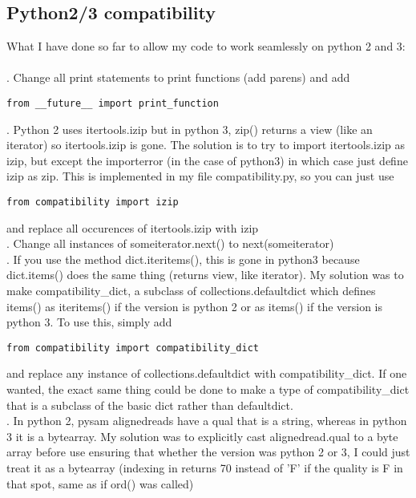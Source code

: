 \documentclass[11pt]{article}
\begin{document}
\subsection*{Python2/3 compatibility}
What I have done so far to allow my code to work seamlessly on python 2 and 3:\\
\\
. Change all print statements to print functions (add parens) and add
\begin{verbatim}
from __future__ import print_function
\end{verbatim}
. Python 2 uses itertools.izip but in python 3, zip() returns a view (like an iterator) so itertools.izip is gone. The solution is to try to import itertools.izip as izip, but except the importerror (in the case of python3) in which case just define izip as zip.
This is implemented in my file compatibility.py, so you can just use
\begin{verbatim}
from compatibility import izip
\end{verbatim}
and replace all occurences of itertools.izip with izip
\\
. Change all instances of someiterator.next() to next(someiterator)
\\
. If you use the method dict.iteritems(), this is gone in python3 because dict.items() does the same thing (returns view, like iterator). My solution was to make compatibility\_dict, a subclass of collections.defaultdict which defines items() as iteritems() if the version is python 2 or as items() if the version is python 3. To use this, simply add
\begin{verbatim}
from compatibility import compatibility_dict
\end{verbatim}
and replace any instance of collections.defaultdict with compatibility\_dict. If one wanted, the exact same thing could be done to make a type of compatibility\_dict that is a subclass of the basic dict rather than defaultdict.
\\
. In python 2, pysam alignedreads have a qual that is a string, whereas in python 3 it is a bytearray. My solution was to explicitly cast alignedread.qual to a byte array before use ensuring that whether the version was python 2 or 3, I could just treat it as a bytearray (indexing in returns 70 instead of 'F' if the quality is F in that spot, same as if ord() was called)
\end{document}
